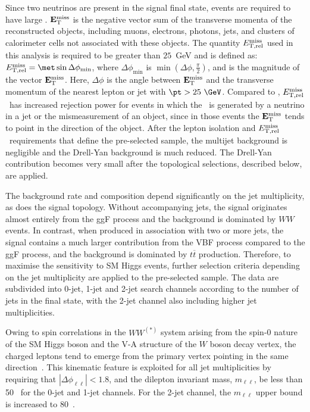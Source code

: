 \documentclass[final,3p,times,twocolumn]{elsarticle}
\newcommand{\metrel}{\ensuremath{E_{\rm T,rel}^{\rm miss}}}
\newcommand{\ZeroJet}{\mbox{0-jet}}
\newcommand{\OneJet}{\mbox{1-jet}}
\newcommand{\TwoJet}{\mbox{2-jet}}
\newcommand{\hwwmll}{\ensuremath{m_{\ell\ell}}}
\def\CaloMETCutem{\ensuremath{25}}
\renewcommand{\ttbar}{\ensuremath{t\overline{t}}}
\begin{document}
Since two neutrinos are present in the signal final state, 
events are required to have large \met{}. %
${\bf E}_{\rm T}^{\rm miss}$ is the negative vector sum of the transverse momenta 
of the reconstructed objects, including muons, electrons,
photons, jets, and clusters of calorimeter cells not associated with these objects.
The quantity $\metrel$ used in this analysis 
is required  to be greater than \CaloMETCutem~GeV and is defined as:
$\metrel = \met\sin\Delta\phi_{\min}$, where $\Delta\phi_{\min}$ is 
$\min(\Delta\phi, \frac{\pi}{2})$, and \met{} is the magnitude of the vector ${\bf E}_{\rm T}^{\rm miss}$. 
Here, $\Delta\phi$ is the angle between 
${\bf E}_{\rm T}^{\rm miss}$ and the transverse momentum of the 
nearest lepton or jet with $\pt > 25~\GeV$.
Compared to \met, \metrel\ has increased rejection power for events in which the \met\ 
is generated by a neutrino in a jet or the mismeasurement of an object, since in
those events the ${\bf E}_{\rm T}^{\rm miss}$ tends to point in the direction of the object.
After the lepton isolation and \metrel\ requirements that define the pre-selected sample, 
the multijet background is negligible and the Drell-Yan background is much reduced. 
The Drell-Yan contribution becomes very small after the topological selections, described below, 
are applied.

The background rate and composition depend significantly on the jet multiplicity, as
does the signal topology. 
Without accompanying jets, the signal originates almost entirely from the ggF
process and the background is dominated by $WW$ events.  
In contrast, when produced in association with two or more jets, the signal
contains a much larger contribution from the VBF process compared to the ggF process, and the background is
dominated by \ttbar{} production.
Therefore, to maximise the sensitivity to SM Higgs events, further selection criteria depending on
the jet multiplicity are applied to the pre-selected sample.
The data are subdivided into 
\ZeroJet, \OneJet{} and \TwoJet{} search channels according to the number of jets in the final state, 
with the \TwoJet{} channel also including higher jet multiplicities.

Owing to spin correlations in the $WW^{(\ast)}$ system arising from the spin-0 nature of
the SM Higgs boson and the V-A structure of the $W$ boson decay vertex, the charged leptons 
tend to emerge from the primary vertex pointing
 in the same direction~\cite{pr_55_167}.  This kinematic feature is
exploited for all jet multiplicities by requiring that 
$|\Delta\phi_{\ell\ell}| < 1.8$, 
and the dilepton invariant mass, $\hwwmll$, be less than 50~\GeV{}
for the \ZeroJet{} and \OneJet{} channels. For the \TwoJet{} channel, the $\hwwmll$
upper bound is increased to 80~\GeV{}.
\end{document}
